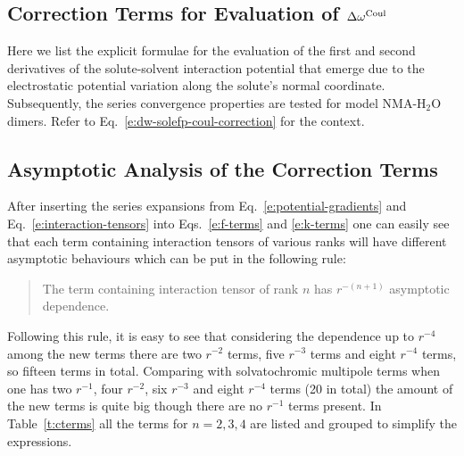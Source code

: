 \documentclass[a4paper,titlepage,twoside,fleqn,12pt]{book}
\begin{document}
\begin{appendices}
\chapter{Correction Terms for Evaluation of $\Delta \omega^{\rm Coul}$\label{a:fk-terms}}

Here we list the explicit formulae for the evaluation of the first and second derivatives
of the solute\hyp{}solvent interaction potential that emerge due to the electrostatic potential
variation along the solute's normal coordinate. Subsequently, the series 
convergence properties are tested for model NMA-H$_2$O dimers. 
Refer to Eq.~\eqref{e:dw-solefp-coul-correction}
for the context.

\section{Asymptotic Analysis of the Correction Terms}

After inserting the series expansions from Eq.~\eqref{e:potential-gradients} 
and Eq.~\eqref{e:interaction-tensors} into Eqs.~\eqref{e:f-terms} and \eqref{e:k-terms}
one can easily see that each term containing interaction tensors of various ranks
will have different asymptotic behaviours which can be put in 
the following rule:
%
\begin{quote}
The term containing interaction tensor of rank $n$ 
has $r^{-(n+1)}$ asymptotic dependence.
\end{quote}
%
Following this rule,
it is easy to see that considering the dependence up to $r^{-4}$ among the new terms
there are two $r^{-2}$ terms, five $r^{-3}$ terms and eight
$r^{-4}$ terms, so fifteen terms in total. Comparing with 
solvatochromic multipole terms when one has two $r^{-1}$,
four $r^{-2}$, six $r^{-3}$ and eight $r^{-4}$ terms (20 in total)
the amount of the new terms is quite big though there are no $r^{-1}$ 
terms present. In Table~\ref{t:cterms} all the terms for $n=2,3,4$
are listed and grouped to simplify the expressions.


\end{appendices}
\end{document}
